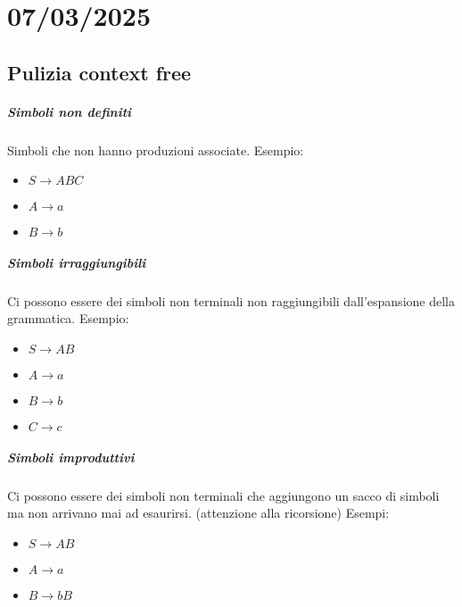 \chapter{07/03/2025}

\section{Pulizia context free}

\paragraph{Simboli non definiti}

Simboli che non hanno produzioni associate.
Esempio:

\begin{itemize}
  \item $S \rightarrow ABC$
  \item $A \rightarrow a$
  \item $B \rightarrow b$
\end{itemize}

\paragraph{Simboli irraggiungibili}

Ci possono essere dei simboli non terminali non raggiungibili dall'espansione della grammatica.
Esempio:

\begin{itemize}
  \item $S \rightarrow AB$
  \item $A \rightarrow a$
  \item $B \rightarrow b$
  \item $C \rightarrow c$
\end{itemize}

\paragraph{Simboli improduttivi}

Ci possono essere dei simboli non terminali che aggiungono un sacco di simboli ma non arrivano mai ad esaurirsi. (attenzione alla ricorsione)
Esempi:

\begin{itemize}
  \item $S \rightarrow AB$
  \item $A \rightarrow a$
  \item $B \rightarrow bB$
\end{itemize}

